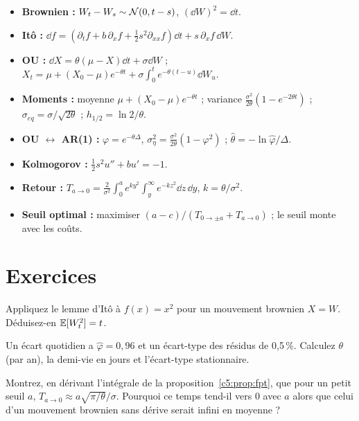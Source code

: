 \begin{whiteboard}
\begin{itemize}[leftmargin=1.2em]
\item \textbf{Brownien :} $W_t - W_s\sim\mathcal{N}(0,t-s)$, $(\dd W)^2 = \dd t$.
\item \textbf{Itô :} $\dd f = (\partial_tf + b\,\partial_xf + \frac12s^2\partial_{xx}f)\dd t + s\,\partial_xf\,\dd W$.
\item \textbf{OU :} $\dd X = \theta(\mu - X)\dd t + \sigma\dd W$ ; $X_t = \mu + (X_0-\mu)e^{-\theta t} + \sigma\int_0^te^{-\theta(t-u)}\dd W_u$.
\item \textbf{Moments :} moyenne $\mu + (X_0-\mu)e^{-\theta t}$ ; variance $\frac{\sigma^2}{2\theta}(1-e^{-2\theta t})$ ; $\sigma_{eq} = \sigma/\sqrt{2\theta}$ ; $h_{1/2} = \ln2/\theta$.
\item \textbf{OU $\leftrightarrow$ AR(1) :} $\varphi = e^{-\theta\Delta}$, $\sigma_\eta^2 = \frac{\sigma^2}{2\theta}(1-\varphi^2)$ ; $\hat\theta = -\ln\hat\varphi/\Delta$.
\item \textbf{Kolmogorov :} $\frac12s^2u'' + bu' = -1$.
\item \textbf{Retour :} $T_{a\to0} = \frac2{\sigma^2}\int_0^ae^{ky^2}\int_y^\infty e^{-kz^2}\dd z\,\dd y$, $k=\theta/\sigma^2$.
\item \textbf{Seuil optimal :} maximiser $(a-c)/(T_{0\to\pm a}+T_{a\to0})$ ; le seuil monte avec les coûts.
\end{itemize}
\end{whiteboard}

\section{Exercices}

\begin{exercise}
Appliquez le lemme d'Itô à $f(x) = x^2$ pour un mouvement brownien $X = W$. Déduisez-en $\mathbb{E}[W_t^2] = t$.
\end{exercise}

\begin{exercise}
Un écart quotidien a $\hat\varphi = 0{,}96$ et un écart-type des résidus de 0,5\,\%. Calculez $\theta$ (par an), la demi-vie en jours et l'écart-type stationnaire.
\end{exercise}

\begin{exercise}
Montrez, en dérivant l'intégrale de la proposition~\ref{c5:prop:fpt}, que pour un petit seuil $a$, $T_{a\to0}\approx a\sqrt{\pi/\theta}/\sigma$. Pourquoi ce temps tend-il vers 0 avec $a$ alors que celui d'un mouvement brownien sans dérive serait infini en moyenne ?
\end{exercise}

